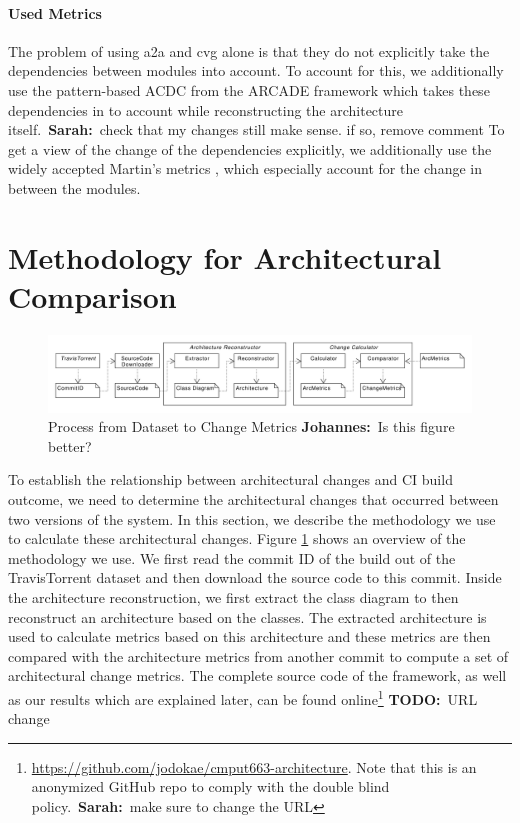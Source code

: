 \documentclass[sigplan, anonymous, review]{acmart}
\newcommand{\sn}[1]{{\color{blue}\textbf{Sarah:}~#1}}
\newcommand{\jk}[1]{{\color{violet}\textbf{Johannes:}~#1}}
\newcommand{\todo}[1]{{ \color{red} \textbf{TODO:}~#1}}
\begin{document}
\paragraph{Used Metrics} 
The problem of using a2a and cvg alone is that they do not explicitly take the dependencies between modules into account. 
To account for this, we additionally use the pattern-based ACDC from the ARCADE framework which takes these dependencies in to account while reconstructing the architecture itself.~\sn{check that my changes still make sense. if so, remove comment}
To get a view of the change of the dependencies explicitly, we additionally use the widely accepted Martin's metrics \cite{Val-MartinsMet}, which especially account for the change in between the modules. 

\section{Methodology for Architectural Comparison}

\begin{figure}[!t]
	\centering
	\includegraphics[width=7in]{assets/combined.pdf}
	\caption{Process from Dataset to Change Metrics \jk{Is this figure better?}}
	\label{architecture}
\end{figure}



To establish the relationship between architectural changes and CI build outcome, we need to determine the architectural changes that occurred between two versions of the system.
In this section, we describe the methodology we use to calculate these architectural changes.
Figure \ref{architecture} shows an overview of the methodology we use.
We first read the commit ID of the build out of the TravisTorrent dataset and then download the source code to this commit. Inside the architecture reconstruction, we first extract the class diagram to then reconstruct an architecture based on the classes. 
The extracted architecture is used to calculate metrics based on this architecture and these metrics are then compared with the architecture metrics from another commit to compute a set of architectural change metrics.
The complete source code of the framework, as well as our results which are explained later, can be found online\footnote{\url{https://github.com/jodokae/cmput663-architecture}. Note that this is an anonymized GitHub repo to comply with the double blind policy.~\sn{make sure to change the URL}} \todo{URL change}
 
\end{document}
